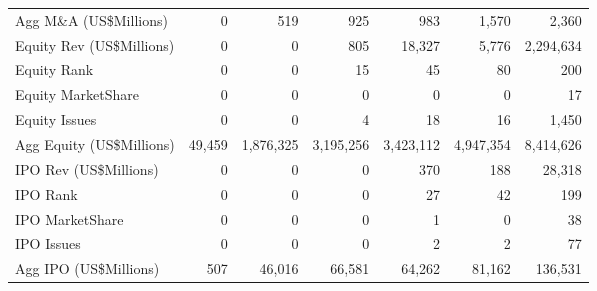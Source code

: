 \documentclass{article}
\begin{document}
\begin{table}[H]
\begin{tabular}{lrrrrrr}
  Agg M\&A (US\$Millions) & 0 & 519 & 925 & 983 & 1,570 & 2,360 \\ 
  Equity Rev (US\$Millions) & 0 & 0 & 805 & 18,327 & 5,776 & 2,294,634 \\ 
  Equity  Rank & 0 & 0 & 15 & 45 & 80 & 200 \\ 
  Equity MarketShare & 0 & 0 & 0 & 0 & 0 & 17 \\ 
  Equity Issues & 0 & 0 & 4 & 18 & 16 & 1,450 \\ 
  Agg Equity (US\$Millions) & 49,459 & 1,876,325 & 3,195,256 & 3,423,112 & 4,947,354 & 8,414,626 \\ 
  IPO Rev (US\$Millions) & 0 & 0 & 0 & 370 & 188 & 28,318 \\ 
  IPO  Rank & 0 & 0 & 0 & 27 & 42 & 199 \\ 
  IPO MarketShare & 0 & 0 & 0 & 1 & 0 & 38 \\ 
  IPO Issues & 0 & 0 & 0 & 2 & 2 & 77 \\ 
  Agg IPO (US\$Millions) & 507 & 46,016 & 66,581 & 64,262 & 81,162 & 136,531 \\ 
   \hline
\end{tabular}
\end{table}
\end{document}
